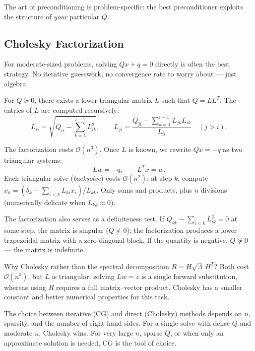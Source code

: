 The art of preconditioning is problem-specific: the best preconditioner exploits the structure of \emph{your} particular $Q$.


\subsection{Cholesky Factorization}\label{ssec:cholesky}

For moderate-sized problems, solving $Qx + q = 0$ directly is often the best strategy.
No iterative guesswork, no convergence rate to worry about --- just algebra.

\begin{defn}\label{def:cholesky}
	For $Q \succeq 0$, there exists a lower triangular matrix $L$ such that $Q = L L^T$.
	The entries of $L$ are computed recursively:
	\begin{equation}\label{eq:cholesky-entries}
		L_{ii} = \sqrt{Q_{ii} - \sum_{k=1}^{i-1} L_{ik}^2},
		\qquad
		L_{ji} = \frac{Q_{ji} - \sum_{k=1}^{i-1} L_{jk} L_{ik}}{L_{ii}}
		\quad (j > i).
	\end{equation}
\end{defn}

The factorization costs $\mathcal{O}(n^3)$.
Once $L$ is known, we rewrite $Qx = -q$ as two triangular systems:
\begin{equation}\label{eq:cholesky-solve}
	L w = -q, \qquad L^T x = w.
\end{equation}
Each triangular solve (\textit{backsolve}) costs $\mathcal{O}(n^2)$: at step $k$, compute $x_k = (b_k - \sum_{i < k} L_{ki} x_i) / L_{kk}$.
Only sums and products, plus $n$ divisions (numerically delicate when $L_{kk} \approx 0$).

The factorization also serves as a definiteness test.
If $Q_{kk} - \sum_{i<k} L_{ik}^2 = 0$ at some step, the matrix is singular ($Q \not\succ 0$); the factorization produces a lower trapezoidal matrix with a zero diagonal block.
If the quantity is negative, $Q \not\succeq 0$ --- the matrix is indefinite.

Why Cholesky rather than the spectral decomposition $R = H\sqrt{\Lambda}\, H^T$?
Both cost $\mathcal{O}(n^3)$, but $L$ is triangular: solving $Lw = z$ is a single forward substitution, whereas using $R$ requires a full matrix--vector product.
Cholesky has a smaller constant and better numerical properties for this task.

The choice between iterative (CG) and direct (Cholesky) methods depends on $n$, sparsity, and the number of right-hand sides.
For a single solve with dense $Q$ and moderate $n$, Cholesky wins.
For very large $n$, sparse $Q$, or when only an approximate solution is needed, CG is the tool of choice.